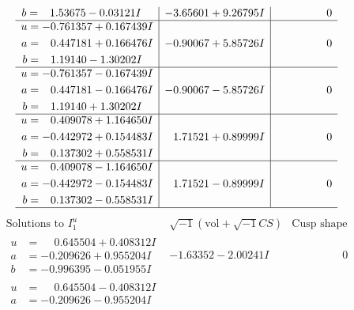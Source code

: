 \documentclass[1p]{elsarticle_modified}
\theoremstyle{definition}
\newcommand{\I}{\sqrt{-1}}
\begin{document}
$$\begin{array}{c|c|c}
\begin{aligned}
b &= \phantom{-}1.53675 - 0.03121 I\end{aligned}
 & -3.65601 + 9.26795 I & \phantom{-0.000000 } 0 \\ \hline\begin{aligned}
u &= -0.761357 + 0.167439 I \\
a &= \phantom{-}0.447181 + 0.166476 I \\
b &= \phantom{-}1.19140 - 1.30202 I\end{aligned}
 & -0.90067 + 5.85726 I & \phantom{-0.000000 } 0 \\ \hline\begin{aligned}
u &= -0.761357 - 0.167439 I \\
a &= \phantom{-}0.447181 - 0.166476 I \\
b &= \phantom{-}1.19140 + 1.30202 I\end{aligned}
 & -0.90067 - 5.85726 I & \phantom{-0.000000 } 0 \\ \hline\begin{aligned}
u &= \phantom{-}0.409078 + 1.164650 I \\
a &= -0.442972 + 0.154483 I \\
b &= \phantom{-}0.137302 + 0.558531 I\end{aligned}
 & \phantom{-}1.71521 + 0.89999 I & \phantom{-0.000000 } 0 \\ \hline\begin{aligned}
u &= \phantom{-}0.409078 - 1.164650 I \\
a &= -0.442972 - 0.154483 I \\
b &= \phantom{-}0.137302 - 0.558531 I\end{aligned}
 & \phantom{-}1.71521 - 0.89999 I & \phantom{-0.000000 } 0\\
 \hline 
 \end{array}$$\newpage$$\begin{array}{c|c|c}  
\text{Solutions to }I^u_{1}& \I (\text{vol} + \sqrt{-1}CS) & \text{Cusp shape}\\
 \hline 
\begin{aligned}
u &= \phantom{-}0.645504 + 0.408312 I \\
a &= -0.209626 + 0.955204 I \\
b &= -0.996395 - 0.051955 I\end{aligned}
 & -1.63352 - 2.00241 I & \phantom{-0.000000 } 0 \\ \hline\begin{aligned}
u &= \phantom{-}0.645504 - 0.408312 I \\
a &= -0.209626 - 0.955204 I \\

\end{aligned}
\end{array}$$
\end{document}
